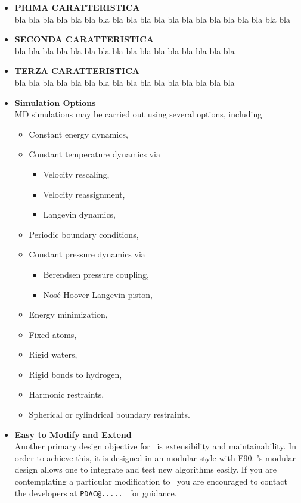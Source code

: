 \begin{itemize}

\item{\bf PRIMA CARATTERISTICA}\\
bla bla bla bla
bla bla bla bla
bla bla bla bla
bla bla bla bla
bla bla bla bla

\item{\bf SECONDA CARATTERISTICA}\\
bla bla bla bla
bla bla bla bla
bla bla bla bla
bla bla bla bla

\item{\bf TERZA CARATTERISTICA}\\
bla bla bla bla
bla bla bla bla
bla bla bla bla
bla bla bla bla

\item{\bf Simulation Options}\\
MD simulations may be carried out using several options, including
\begin{itemize}
  \item Constant energy dynamics,
  \item Constant temperature dynamics via
  \begin{itemize}
    \item Velocity rescaling,
    \item Velocity reassignment,
    \item Langevin dynamics,
  \end{itemize}
  \item Periodic boundary conditions,
  \item Constant pressure dynamics via
  \begin{itemize}
    \item Berendsen pressure coupling,
    \item Nos\'{e}-Hoover Langevin piston,
  \end{itemize}
  \item Energy minimization,
  \item Fixed atoms,
  \item Rigid waters,
  \item Rigid bonds to hydrogen,
  \item Harmonic restraints,
  \item Spherical or cylindrical boundary restraints.
\end{itemize}

\item{\bf Easy to Modify and Extend}\\
Another primary design objective for \PDAC\ is extensibility and 
maintainability. In order to achieve this, it is designed in an 
modular style with F90. 
\PDAC's modular design allows one to integrate and test new algorithms 
easily.  If you are contemplating a particular modification to \PDAC\
you are encouraged to contact the developers at {\tt PDAC@..... }
for guidance.


\end{itemize}
